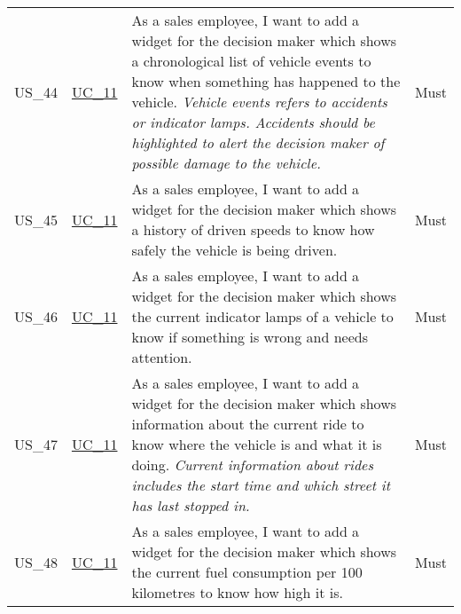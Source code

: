 \begin{footnotesize}
\begin{longtable}[L L L]{ p{} p{} p{} p{} }
      \hypertarget{Ref:US44}{US\_44} & \hyperlink{Ref:UC11}{UC\_11} & As a sales employee, I want to add a \gls{widget} for the decision maker which shows a chronological list of vehicle events to know when something has happened to the vehicle. 
      \newline
      \emph{Vehicle events refers to accidents or indicator lamps. Accidents should be highlighted to alert the decision maker of possible damage to the vehicle.} & Must
      \\
      \hypertarget{Ref:US45}{US\_45} & \hyperlink{Ref:UC11}{UC\_11} & As a sales employee, I want to add a \gls{widget} for the decision maker which shows a history of driven speeds to know how safely the vehicle is being driven. & Must \\
      \hypertarget{Ref:US46}{US\_46} & \hyperlink{Ref:UC11}{UC\_11} & As a sales employee, I want to add a \gls{widget} for the decision maker which shows the current indicator lamps of a vehicle to know if something is wrong and needs attention. & Must \\
      \hypertarget{Ref:US47}{US\_47} & \hyperlink{Ref:UC11}{UC\_11} & As a sales employee, I want to add a \gls{widget} for the decision maker which shows information about the current ride to know where the vehicle is and what it is doing.
      \newline
      \emph{Current information about rides includes the start time and which street it has last stopped in.} & Must \\
      \hypertarget{Ref:US48}{US\_48} & \hyperlink{Ref:UC11}{UC\_11} & As a sales employee, I want to add a \gls{widget} for the decision maker which shows the current fuel consumption per 100 kilometres to know how high it is. & Must \\

      \bottomrule
    \end{longtable}
  \end{footnotesize}
  \rmfamily

